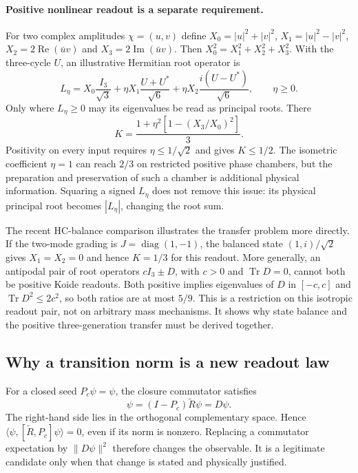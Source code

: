 \paragraph{Positive nonlinear readout is a separate requirement.}
For two complex amplitudes $\chi=(u,v)$ define
$X_0=|u|^2+|v|^2$, $X_1=|u|^2-|v|^2$,
$X_2=2\operatorname{Re}(\bar uv)$ and
$X_3=2\operatorname{Im}(\bar uv)$. Then
$X_0^2=X_1^2+X_2^2+X_3^2$. With the three-cycle $U$, an illustrative
Hermitian root operator is
\begin{equation}
 L_\eta=X_0\frac{I_3}{\sqrt3}
 +\eta X_1\frac{U+U^*}{\sqrt6}
 +\eta X_2\frac{i(U-U^*)}{\sqrt6},\qquad \eta\geq0.
\end{equation}
Only where $L_\eta\geq0$ may its eigenvalues be read as principal
roots. There
\begin{equation}
 K=\frac{1+\eta^2[1-(X_3/X_0)^2]}3.
\end{equation}
Positivity on every input requires $\eta\leq1/\sqrt2$ and gives
$K\leq1/2$. The isometric coefficient $\eta=1$ can reach $2/3$
on restricted positive phase chambers, but the preparation and
preservation of such a chamber is additional physical information.
Squaring a signed $L_\eta$ does not remove this issue: its physical
principal root becomes $|L_\eta|$, changing the root sum.

The recent HC-balance comparison illustrates the transfer problem
more directly. If the two-mode grading is $J=\operatorname{diag}(1,-1)$,
the balanced state $(1,i)/\sqrt2$ gives $X_1=X_2=0$ and hence $K=1/3$
for this readout. More generally, an antipodal pair of root operators
$cI_3\pm D$, with $c>0$ and $\operatorname{Tr}D=0$, cannot both
be positive Koide readouts. Both positive implies eigenvalues of $D$
in $[-c,c]$ and $\operatorname{Tr}D^2\leq2c^2$, so both ratios
are at most $5/9$. This is a restriction on this isotropic readout
pair, not on arbitrary mass mechanisms. It shows why state balance
and the positive three-generation transfer must be derived together.
\subsection{Why a transition norm is a new readout law}
For a closed seed $P_c\psi=\psi$, the closure commutator satisfies
\begin{equation}
 [\widetilde R,P_c]\psi=(I-P_c)\widetilde R\psi=D\psi.
\end{equation}
The right-hand side lies in the orthogonal complementary space. Hence
$\langle\psi,[\widetilde R,P_c]\psi\rangle=0$, even if its
norm is nonzero. Replacing a commutator expectation by
$\|D\psi\|^2$ therefore changes the observable. It is a legitimate
candidate only when that change is stated and physically justified.

